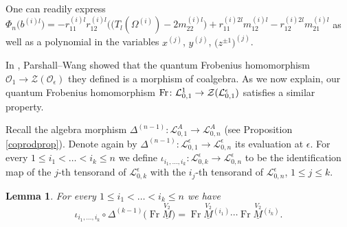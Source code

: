 \documentclass[pdftex]{sigma}%
\numberwithin{equation}{section}
\numberwithin{figure}{section}
\newtheorem{lem}[teo]{Lemma}
\newcommand{\e}{\epsilon}
\newcommand{\Ll}{{\mathcal L}}
\newcommand{\ra}{\rightarrow}
\begin{document}
One can readily express $\Phi_n\big(b^{(i)l}\big) = -r_{11}^{(i)l}r_{12}^{(i)l}\big((T_l(\Omega^{(i)}) - 2 m_{22}^{(i)l}\big)+ r_{11}^{(i)2l}m_{12}^{(i)l}-r_{12}^{(i)2l}m_{21}^{(i)l}$ as well as a polynomial in the variables $x^{(j)}$, $y^{(j)}$, $\big(z^{\pm 1}\big)^{(j)}$.

In \cite{PW}, Parshall--Wang showed that the quantum Frobenius homomorphism $\mathcal{O}_1 \ra \mathcal{Z}(\mathcal{O}_\e)$ they defined is a morphism of coalgebra. As we now explain, our quantum Frobenius homomorphism ${\rm Fr}\colon \Ll_{0,1}^1\rightarrow \mathcal{Z}(\Ll_{0,1}^\epsilon)$ satisfies a similar property.

Recall the algebra morphism $\Delta^{(n-1)}\colon \Ll_{0,1}^A\rightarrow \Ll_{0,n}^A$ (see Proposition \ref{coprodprop}). Denote again by $\Delta^{(n-1)}\colon \Ll_{0,1}^\epsilon\rightarrow \Ll_{0,n}^\epsilon$ its evaluation at $\epsilon$. For every $1\leq i_1< \dots < i_k\leq n$ we define $\iota_{i_1,\dots,i_k}\colon \Ll_{0,k}^\e \ra \Ll_{0,n}^\e$ to be the identification map of the $j$-th tensorand of $\Ll_{0,k}^\e$ with the $i_j$-th tensorand of $\Ll_{0,n}^\e$, $1\leq j\leq k$.

\begin{lem} For every $1\leq i_1< \dots < i_k\leq n$ we have
\begin{equation}\label{DeltaFr0}
\iota_{i_1,\dots,i_k}\circ \Delta^{(k-1)}\big(\!\operatorname{Fr}\underline{\stackrel{V_2}{M}}\big) =\operatorname{Fr}\underline{\stackrel{V_2}{M}}{}^{(i_1)}\cdots \operatorname{Fr}\underline{\stackrel{V_2}{M}}{}^{(i_k)}.
\end{equation}
\end{lem}
\end{document}
